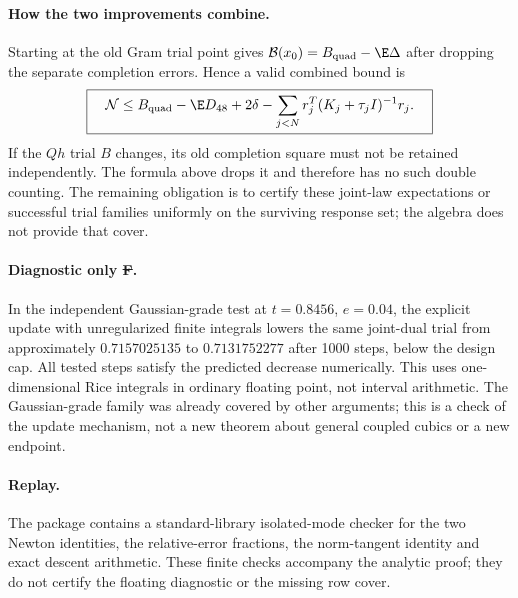 \paragraph{How the two improvements combine.}
Starting at the old Gram trial point gives
$\mathcal B(x_0)=B_{\rm quad}-\E\Delta$ after dropping the separate
completion errors. Hence a valid combined bound is
\[
 \boxed{\quad
 \mathcal N\le B_{\rm quad}-\E D_{48}+2\delta
       -\sum_{j<N}r_j^T(K_j+\tau_jI)^{-1}r_j.
 \quad}
\]
If the $Qh$ trial $B$ changes, its old completion square must not be
retained independently. The formula above drops it and therefore has
no such double counting. The remaining obligation is to certify these
joint-law expectations or successful trial families uniformly on the
surviving response set; the algebra does not provide that cover.

\paragraph{Diagnostic only \st{F}.}
In the independent Gaussian-grade test at $t=0.8456$, $e=0.04$, the
explicit update with unregularized finite integrals lowers the same
joint-dual trial from approximately $0.7157025135$ to $0.7131752277$
after 1000 steps, below the design cap. All tested steps satisfy the
predicted decrease numerically. This uses one-dimensional Rice integrals
in ordinary floating point, not interval arithmetic. The Gaussian-grade
family was already covered by other arguments; this is a check of the
update mechanism, not a new theorem about general coupled cubics or a
new endpoint.

\paragraph{Replay.}
The package  contains a
standard-library isolated-mode checker for the two Newton identities,
the relative-error fractions, the norm-tangent identity and exact
descent arithmetic. These finite checks accompany the analytic proof;
they do not certify the floating diagnostic or the missing row cover.

